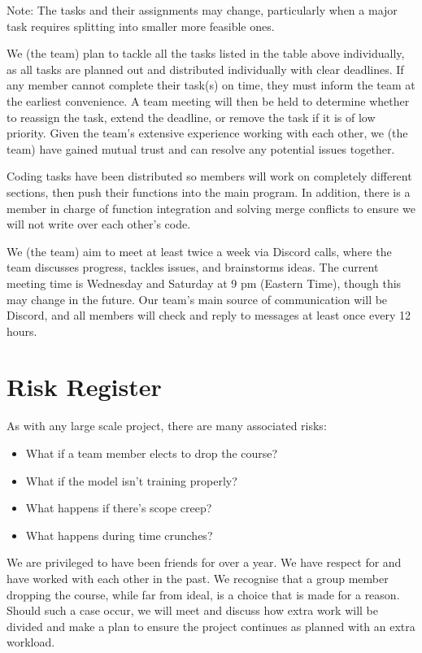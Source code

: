 \documentclass{article} %
\begin{document}
\clearpage

Note: The tasks and their assignments may change, particularly when a major task requires splitting into smaller more feasible ones. 

We (the team) plan to tackle all the tasks listed in the table above individually, as all tasks are planned out and distributed individually with clear deadlines. If any member cannot complete their task(s) on time, they must inform the team at the earliest convenience. A team meeting will then be held to determine whether to reassign the task, extend the deadline, or remove the task if it is of low priority. Given the team’s extensive experience working with each other, we (the team) have gained mutual trust and can resolve any potential issues together.

Coding tasks have been distributed so members will work on completely different sections, then push their functions into the main program. In addition, there is a member in charge of function integration and solving merge conflicts to ensure we will not write over each other's code.

We (the team) aim to meet at least twice a week via Discord calls, where the team discusses progress, tackles issues, and brainstorms ideas. The current meeting time is Wednesday and Saturday at 9 pm (Eastern Time), though this may change in the future. Our team's main source of communication will be Discord, and all members will check and reply to messages at least once every 12 hours.


\section{Risk Register}
As with any large scale project, there are many associated risks:

\begin{itemize}
  \item What if a team member elects to drop the course?
  \item What if the model isn't training properly?
  \item What happens if there's scope creep?
  \item What happens during time crunches?
\end{itemize}

We are privileged to have been friends for over a year. We have respect for and have worked with each other in the past. We recognise that a group member dropping the course, while far from ideal, is a choice that is made for a reason. Should such a case occur, we will meet and discuss how extra work will be divided and make a plan to ensure the project continues as planned with an extra workload.
\end{document}
